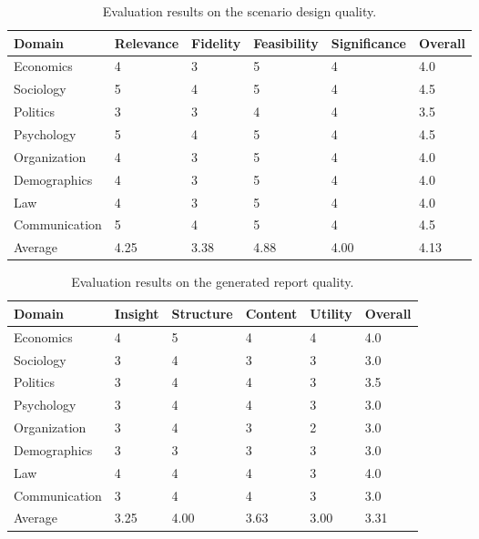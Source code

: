 \documentclass{article}
\theoremstyle{definition}
\theoremstyle{theorem}
\theoremstyle{proof}
\theoremstyle{remark}
\begin{document}
\begin{table}[t]
    \centering
    \caption{Evaluation results on the scenario design quality.}
    \renewcommand\arraystretch{1.1}
    \label{tab:scenario_design}
    \begin{tabular}{m{2.3cm}|m{1.8cm}<{\centering}m{1.6cm}<{\centering}m{1.8cm}<{\centering}m{1.8cm}<{\centering}|m{1.5cm}<{\centering}}
        \hline\hline
        \textbf{Domain} & \textbf{Relevance} & \textbf{Fidelity} & \textbf{Feasibility} & \textbf{Significance} & \textbf{Overall} \\
        \hline
        Economics & 4 & 3 & 5 & 4 & 4.0 \\
        Sociology & 5 & 4 & 5 & 4 & 4.5 \\
        Politics & 3 & 3 & 4 & 4 & 3.5 \\
        Psychology & 5 & 4 & 5 & 4 & 4.5 \\
        Organization & 4 & 3 & 5 & 4 & 4.0 \\
        Demographics & 4 & 3 & 5 & 4 & 4.0 \\
        Law & 4 & 3 & 5 & 4 & 4.0 \\
        Communication & 5 & 4 & 5 & 4 & 4.5 \\
        \hline
        {Average} & 4.25 & 3.38 & 4.88 & 4.00 & 4.13 \\
        \hline\hline
    \end{tabular}
\end{table}

\begin{table}[t]
    \centering
    \caption{Evaluation results on the generated report quality.}
    \renewcommand\arraystretch{1.1}
    \label{tab:report_quality}
    \begin{tabular}{m{2.3cm}|m{1.8cm}<{\centering}m{1.6cm}<{\centering}m{1.8cm}<{\centering}m{1.8cm}<{\centering}|m{1.5cm}<{\centering}}
        \hline\hline
        \textbf{Domain} & \textbf{Insight} & \textbf{Structure} & \textbf{Content} & \textbf{Utility} & \textbf{Overall} \\
        \hline
        Economics & 4 & 5 & 4 & 4 & 4.0 \\
        Sociology & 3 & 4 & 3 & 3 & 3.0 \\
        Politics & 3 & 4 & 4 & 3 & 3.5 \\
        Psychology & 3 & 4 & 4 & 3 & 3.0 \\
        Organization & 3 & 4 & 3 & 2 & 3.0 \\
        Demographics & 3 & 3 & 3 & 3 & 3.0 \\
        Law & 4 & 4 & 4 & 3 & 4.0 \\
        Communication & 3 & 4 & 4 & 3 & 3.0 \\
        \hline
        {Average} & 3.25 & 4.00 & 3.63 & 3.00 & 3.31 \\
        \hline\hline
    \end{tabular}
    \vspace{-0.5cm}
\end{table}
\end{document}
